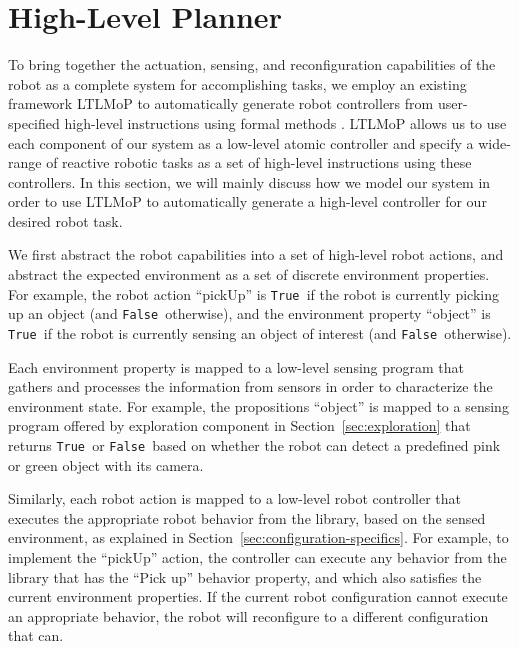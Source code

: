 \documentclass[conference]{IEEEtran}
\newcommand{\lt}{{\tt True }}
\newcommand{\lf}{{\tt False }}
\begin{document}
\section{High-Level Planner}
\label{sec:high-level}
%

To bring together the actuation, sensing, and reconfiguration capabilities of  the  robot as a complete system for accomplishing  tasks, we employ an existing framework LTLMoP to automatically generate robot controllers from user-specified high-level instructions using formal methods \cite{DBLP:conf/iros/FinucaneJK10,DBLP:journals/trob/Kress-GazitFP09}.
LTLMoP allows us to use each component of our system as a low-level atomic controller and specify a wide-range of reactive robotic tasks as a set of high-level instructions using these controllers.
In this section, we will mainly discuss how we model our system in order to use LTLMoP to automatically generate a high-level controller for our desired robot task.

We first abstract the robot capabilities into a set of high-level robot actions, and abstract the expected environment as a set of discrete environment properties.
For example, the robot action ``pickUp'' is \lt if the robot is currently picking up an object (and \lf otherwise), and
the environment property ``object'' is \lt if the robot is currently sensing an object of interest (and \lf otherwise).

Each environment property is mapped to a low-level sensing program that gathers and processes the information from sensors in order to characterize the environment state. For example, the propositions ``object'' is mapped to a sensing program offered by exploration component in Section~\ref{sec:exploration} that returns \lt or \lf based on whether the robot can detect a predefined pink or green object with its camera.

Similarly, each robot action is mapped to a low-level robot controller that executes the appropriate robot behavior from the library, based on the sensed environment, as explained in Section~\ref{sec:configuration-specifics}.
For example, to implement the ``pickUp'' action, the controller can execute any behavior from the library that has the ``Pick up''  behavior property, and which also satisfies the current environment properties.  If the current robot configuration cannot execute an appropriate behavior, the robot will reconfigure to a different configuration that can.
\end{document}
